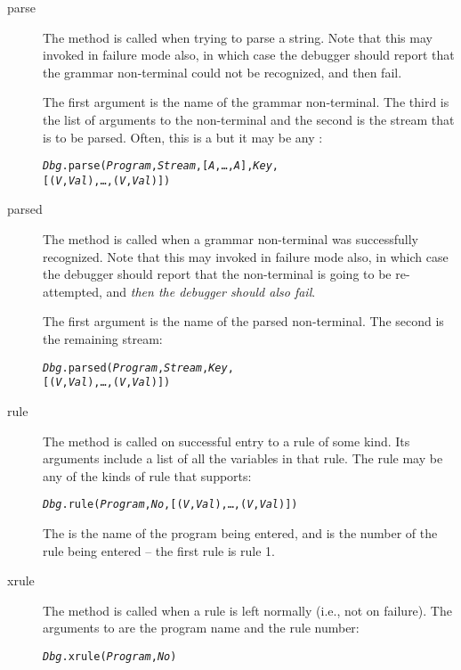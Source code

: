\begin{description}
\item[parse]
The  method is called when trying to parse a string. Note that this may invoked in failure mode also, in which case the debugger should report that the grammar non-terminal could not be recognized, and then fail.

The first argument is the name of the grammar non-terminal. The third is the list of arguments to the non-terminal and the second is the stream that is to be parsed. Often, this is a  but it may be any :
\begin{alltt}
\emph{Dbg}.parse(\emph{Program},\emph{Stream},[\emph{A},\ldots,\emph{A\subn}],\emph{Key},
          [(\emph{V},\emph{Val}),\ldots,(\emph{V\subn},\emph{Val\subn})])
\end{alltt}


\item[parsed]
The  method is called when a grammar non-term\-in\-al was successfully recognized.  Note that this may invoked in failure mode also, in which case the debugger should report that the non-terminal is going to be re-attempted, and \emph{then the debugger should also fail}.

The first argument is the name of the parsed non-terminal. The second is the remaining stream:
\begin{alltt}
\emph{Dbg}.parsed(\emph{Program},\emph{Stream},\emph{Key},
            [(\emph{V},\emph{Val}),\ldots,(\emph{V\subn},\emph{Val\subn})])
\end{alltt}

\item[rule]
The  method is called on successful entry to a rule of some kind. Its arguments include a list of all the variables in that rule. The rule may be any of the kinds of rule that \go supports:
\begin{alltt}
\emph{Dbg}.rule(\emph{Program},\emph{No},[(\emph{V},\emph{Val}),\ldots,(\emph{V\subn},\emph{Val\subn})])
\end{alltt}
The  is the name of the program being entered, and  is the number of the rule being entered -- the first rule is rule 1.

\item[xrule]
The  method is called when a rule is left normally (i.e., not on failure). The arguments to  are the program name and the rule number:
\begin{alltt}
\emph{Dbg}.xrule(\emph{Program},\emph{No})
\end{alltt}



\end{description}
